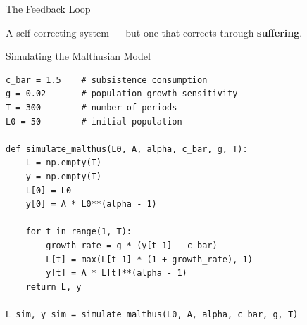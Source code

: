 \documentclass[aspectratio=169, 10pt]{beamer}
\begin{document}
\begin{frame}{The Feedback Loop}
\begin{center}
\end{center}
\vspace{0.5em}
A self-correcting system --- but one that corrects through \textbf{suffering}.
\end{frame}

\begin{frame}[fragile]{Simulating the Malthusian Model}
\begin{lstlisting}
c_bar = 1.5    # subsistence consumption
g = 0.02       # population growth sensitivity
T = 300        # number of periods
L0 = 50        # initial population

def simulate_malthus(L0, A, alpha, c_bar, g, T):
    L = np.empty(T)
    y = np.empty(T)
    L[0] = L0
    y[0] = A * L0**(alpha - 1)

    for t in range(1, T):
        growth_rate = g * (y[t-1] - c_bar)
        L[t] = max(L[t-1] * (1 + growth_rate), 1)
        y[t] = A * L[t]**(alpha - 1)
    return L, y

L_sim, y_sim = simulate_malthus(L0, A, alpha, c_bar, g, T)
\end{lstlisting}
\end{frame}
\end{document}
